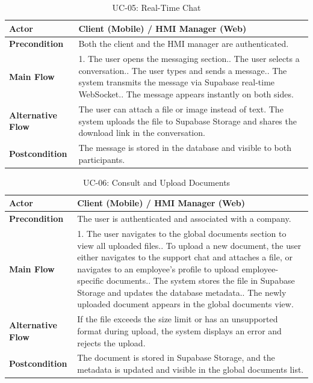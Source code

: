 \begin{table}[H]
\centering
\caption{UC-05: Real-Time Chat}
\label{tab:uc05}
\begin{tabular}{|l|p{10cm}|}
\hline
\textbf{Actor} & Client (Mobile) / HMI Manager (Web) \\
\hline
\textbf{Precondition} & Both the client and the HMI manager are authenticated. \\
\hline
\textbf{Main Flow} & 1. The user opens the messaging section.\newline 2. The user selects a conversation.\newline 3. The user types and sends a message.\newline 4. The system transmits the message via Supabase real-time WebSocket.\newline 5. The message appears instantly on both sides. \\
\hline
\textbf{Alternative Flow} & The user can attach a file or image instead of text. The system uploads the file to Supabase Storage and shares the download link in the conversation. \\
\hline
\textbf{Postcondition} & The message is stored in the database and visible to both participants. \\
\hline
\end{tabular}
\end{table}

\begin{table}[H]
\centering
\caption{UC-06: Consult and Upload Documents}
\label{tab:uc06}
\begin{tabular}{|l|p{10cm}|}
\hline
\textbf{Actor} & Client (Mobile) / HMI Manager (Web) \\
\hline
\textbf{Precondition} & The user is authenticated and associated with a company. \\
\hline
\textbf{Main Flow} & 1. The user navigates to the global documents section to view all uploaded files.\newline 2. To upload a new document, the user either navigates to the support chat and attaches a file, or navigates to an employee's profile to upload employee-specific documents.\newline 3. The system stores the file in Supabase Storage and updates the database metadata.\newline 4. The newly uploaded document appears in the global documents view. \\
\hline
\textbf{Alternative Flow} & If the file exceeds the size limit or has an unsupported format during upload, the system displays an error and rejects the upload. \\
\hline
\textbf{Postcondition} & The document is stored in Supabase Storage, and the metadata is updated and visible in the global documents list. \\
\hline
\end{tabular}
\end{table}

